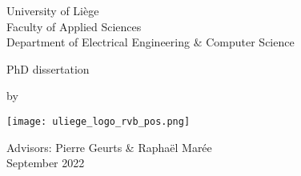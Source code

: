 \makeatletter


\begin{titlepage}

  \begin{center}
    {\Large University of Liège} \\
    \vspace{10pt}
    Faculty of Applied Sciences \\
    Department of Electrical Engineering \& Computer Science

    \vfill 

    PhD dissertation 

    \vspace{2em}

    {
      \color{primary}
      \rm
      \bf
      \Huge
      \@title
    }

    \vspace{1em}

    by \@author

    \vfill


    \begin{minipage}{0.4\linewidth}
      \texttt{[image: uliege\_logo\_rvb\_pos.png]}
    \end{minipage}
    \begin{minipage}{0.55\linewidth}
      \begin{flushright}
        Advisors: Pierre Geurts \& Raphaël Marée \\
        September 2022
      \end{flushright}
    \end{minipage}

  \end{center}
\end{titlepage}

\restoregeometry 

\makeatother
